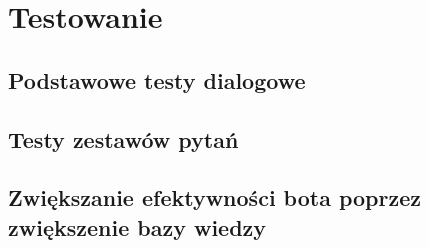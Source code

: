\chapter{Testowanie}

\section{Podstawowe testy dialogowe}

\section{Testy zestawów pytań}

\section{Zwiększanie efektywności bota poprzez zwiększenie bazy wiedzy}
